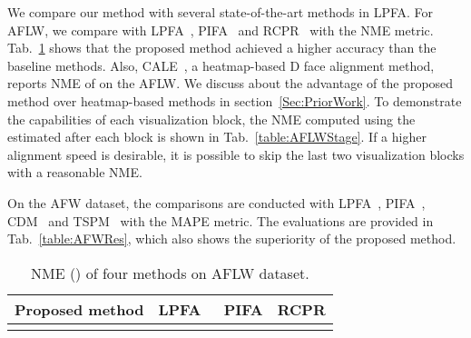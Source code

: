 We compare our method with several state-of-the-art methods in LPFA. 
For AFLW, we compare with LPFA~\cite{jourabloo2016large}, PIFA~\cite{jourabloo2015pose} and RCPR~\cite{burgos2013robust} with the NME metric. 
Tab.~\ref{table:AFLWRes} shows that the proposed method achieved a higher accuracy than the baseline methods. Also, CALE~\cite{bulat2016convolutional}, a heatmap-based D face alignment method, reports NME of  on the AFLW. We discuss about the advantage of the proposed method over heatmap-based methods in section~\ref{Sec:PriorWork}.
To demonstrate the capabilities of each visualization block, the NME computed using the estimated  after each block is shown in Tab.~\ref{table:AFLWStage}. 
If a higher alignment speed is desirable, it is possible to skip the last two visualization blocks with a reasonable NME.





On the AFW dataset, the comparisons are conducted with LPFA~\cite{jourabloo2016large}, PIFA~\cite{jourabloo2015pose}, CDM~\cite{yu2013pose} and TSPM~\cite{zhu2012face} with the MAPE metric. 
The evaluations are provided in Tab.~\ref{table:AFWRes}, which also shows the superiority of the proposed method.



\begin{table}[t!]\small
\caption{NME () of four methods on AFLW dataset.}
\begin{center}
\begin{tabular}{ c|c|c|c } 
 \hline
 Proposed method & LPFA~\cite{jourabloo2016large} & PIFA & RCPR \\ 
 \hline
  &  &  &  \\
 \hline  
\end{tabular}
\end{center}
\label{table:AFLWRes}\vspace{-7mm}
\end{table}





\begin{table}[t!]\small
\caption{NME () of the proposed method at each visualization block on AFLW dataset. The initial NME is 25.8.}
\vspace{-3mm}
\begin{center}
\end{center}
\label{table:AFLWStage}\vspace{-6mm}
\end{table}









